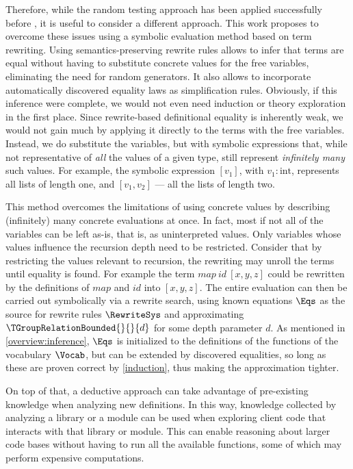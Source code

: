 Therefore, while the random testing approach has been applied successfully before \cite{JFP2017:Smallbone,ICAD2013:Claessen,hipstercond,ITP2017:Johansson,2018AISC:Einarsdottir}, it is useful to consider a different approach. 
This work proposes to overcome these issues using a symbolic evaluation method based on term rewriting.
Using semantics-preserving rewrite rules allows to infer that terms are equal without having to
substitute concrete values for the free variables, eliminating the need for random generators.
It also allows to incorporate automatically discovered equality laws as simplification rules.
Obviously, if this inference were complete, we would not even need induction or theory exploration in
the first place.
Since rewrite-based definitional equality is inherently weak, we would not gain much by applying it
directly to the terms with the free variables.
Instead, we do substitute the variables, but with symbolic expressions that, while not representative of
\emph{all} the values of a given type, still represent \emph{infinitely many} such values.
For example, the symbolic expression $[v_1]$, with $v_1:\textrm{int}$, represents all lists of length one,
and $[v_1, v_2]$ --- all the lists of length two.

This method overcomes the limitations of using concrete values by describing (infinitely) many
concrete evaluations at once.
In fact, most if not all of the variables can be left as-is, that is, as uninterpreted values.
Only variables whose values influence the recursion depth need to be restricted.
Consider that by restricting the values relevant to recursion, the rewriting may unroll the terms until equality is found.
For example the term $map~id~[x,y,z]$ could be rewritten by the definitions of $map$ and $id$ into $[x,y,z]$.
The entire evaluation can then be carried out symbolically via a rewrite search, using known equations
$\Eqs$ as the source for rewrite rules $\RewriteSys$ and approximating $\TGroupRelationBounded{}{}{d}$
for some depth parameter $d$.
As mentioned in \autoref{overview:inference}, $\Eqs$ is initialized to the definitions of the functions
of the vocabulary $\Vocab$, but can be extended by discovered equalities, so long as these are proven
correct by \autoref{induction}, thus making the approximation tighter.

On top of that, a deductive approach can take advantage of pre-existing knowledge when analyzing new definitions.
In this way, knowledge collected by analyzing a library or a module can be used when exploring client code that interacts with that library or module.
This can enable reasoning about larger code bases without having to run all the available functions, some of which may perform expensive computations.

